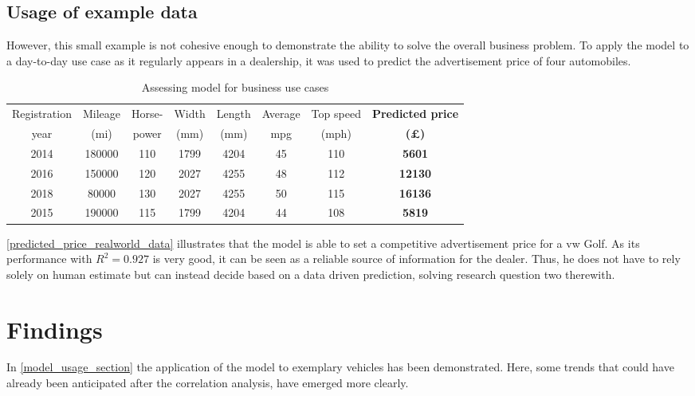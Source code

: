 \subsection{Usage of example data}
However, this small example is not cohesive enough to demonstrate the ability to solve the overall business problem.
To apply the model to a day-to-day use case as it regularly appears in a dealership,
it was used to predict the advertisement price of four automobiles.
\begin{table}[H]
    \begin{adjustbox}{width={\textwidth}}
        \begin{tabular}{|c|c|c|c|c|c|c|c|}
            \hline
            Registration & Mileage & Horse- & Width & Length & Average & Top speed & \textbf{Predicted price} \\[-1ex]
            year         & (mi)    & power  & (mm)  & (mm)   & mpg     & (mph)     & \textbf{(£)}             \\ \hline
            2014         & 180000  & 110    & 1799  & 4204   & 45      & 110       & \textbf{5601}            \\\hline
            2016         & 150000  & 120    & 2027  & 4255   & 48      & 112       & \textbf{12130}           \\\hline
            2018         & 80000   & 130    & 2027  & 4255   & 50      & 115       & \textbf{16136}           \\\hline
            2015         & 190000  & 115    & 1799  & 4204   & 44      & 108       & \textbf{5819}            \\ \hline
        \end{tabular}
    \end{adjustbox}
    \caption{Assessing model for business use cases}
    \label{predicted_price_realworld_data}
\end{table}
\autoref{predicted_price_realworld_data} illustrates that the model is able to set a competitive advertisement price
for a \ac{vw} Golf. As its performance with $R^2 = 0.927$ is very good, it can be seen as a reliable source of information for the dealer.
Thus, he does not have to rely solely on human estimate but can instead decide based on a data driven prediction, solving research question two therewith. 
\section{Findings}
In \autoref{model_usage_section} the application of the model to exemplary vehicles has been demonstrated.
Here, some trends that could have already been anticipated after the correlation analysis, have emerged more clearly.
